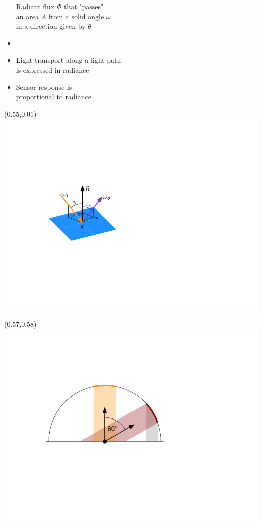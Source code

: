 \documentclass[utf8,stillsansserifmath,fleqn,t]{beamer}
\begin{document}
\begin{frame}
\begin{itemize}
Radiant flux $\Phi$
that "passes"\\ an area $A$
from a solid angle $\omega$\\
in a direction given by $\theta$
\item[~] ~
\item Light transport along a light path\\ is expressed in radiance
\item Sensor response is\\ proportional to radiance
\end{itemize}
\end{frame}

\begin{frame}[label=radiometry-light-at-surface]
\begin{textblock}{0.43}(0.55,0.01)\includegraphics[width=\textwidth]{./fig/brdf.pdf}\end{textblock}
\begin{textblock}{0.40}(0.57,0.58)\includegraphics[width=\textwidth]{./fig/attenuation-cos-theta.pdf}\end{textblock}

\end{frame}
\end{document}
